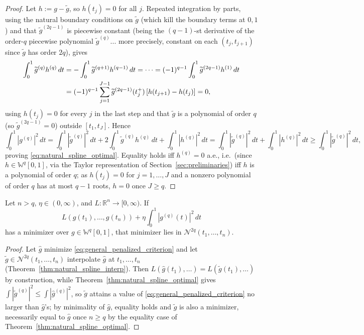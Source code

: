 \begin{proof}
Let $h:=g-\widetilde{g}$, so $h(t_j)=0$ for all $j$. Repeated integration
by parts, using the natural boundary conditions on $\widetilde{g}$ (which
kill the boundary terms at $0,1$) and that $\widetilde{g}^{(2q-1)}$ is
piecewise constant (being the $(q-1)$-st derivative of the order-$q$
piecewise polynomial $\widetilde{g}^{(q)}$... more precisely, constant on
each $(t_j,t_{j+1})$ since $\widetilde{g}$ has order $2q$), gives
\begin{align}
\int_0^1\widetilde{g}^{(q)}h^{(q)}\,dt &= -\int_0^1\widetilde{g}^{(q+1)}
h^{(q-1)}\,dt = \cdots = (-1)^{q-1}\int_0^1\widetilde{g}^{(2q-1)}h^{(1)}\,dt
\notag \\
&= (-1)^{q-1}\sum_{j=1}^{J-1}\widetilde{g}^{(2q-1)}(t_j^+)\,[h(t_{j+1})-
h(t_j)] = 0,
\label{eq:integration_by_parts}
\end{align}
using $h(t_j)=0$ for every $j$ in the last step and that $\widetilde{g}$
is a polynomial of order $q$ (so $\widetilde{g}^{(2q-1)}=0$) outside
$[t_1,t_J]$. Hence
\[
\int_0^1|g^{(q)}|^2\,dt = \int_0^1|\widetilde{g}^{(q)}|^2\,dt + 2\int_0^1
\widetilde{g}^{(q)}h^{(q)}\,dt + \int_0^1|h^{(q)}|^2\,dt =
\int_0^1|\widetilde{g}^{(q)}|^2\,dt + \int_0^1|h^{(q)}|^2\,dt \geq
\int_0^1|\widetilde{g}^{(q)}|^2\,dt,
\]
proving \eqref{eq:natural_spline_optimal}. Equality holds iff
$h^{(q)}=0$ a.e., i.e.\ (since $h\in\mathbb{W}^q[0,1]$, via the Taylor
representation of Section~\ref{sec:preliminaries}) iff $h$ is a
polynomial of order $q$; as $h(t_j)=0$ for $j=1,\dots,J$ and a nonzero
polynomial of order $q$ has at most $q-1$ roots, $h=0$ once $J\geq q$.
\end{proof}

\begin{theorem}
\label{thm:natural_spline_finite_dim}
Let $n>q$, $\eta\in(0,\infty)$, and $L:\mathbb{R}^n\to[0,\infty)$. If
\begin{equation}
L(g(t_1),\dots,g(t_n)) + \eta\int_0^1|g^{(q)}(t)|^2\,dt
\label{eq:general_penalized_criterion}
\end{equation}
has a minimizer over $g\in\mathbb{W}^q[0,1]$, that minimizer lies in
$\mathcal{N}^{2q}(t_1,\dots,t_n)$.
\end{theorem}

\begin{proof}
Let $\widehat{g}$ minimize \eqref{eq:general_penalized_criterion} and let
$\widetilde{g}\in\mathcal{N}^{2q}(t_1,\dots,t_n)$ interpolate $\widehat{g}$
at $t_1,\dots,t_n$ (Theorem~\ref{thm:natural_spline_interp}). Then
$L(\widehat{g}(t_1),\dots)=L(\widetilde{g}(t_1),\dots)$ by construction,
while Theorem~\ref{thm:natural_spline_optimal} gives $\int|\widetilde{g}
^{(q)}|^2\leq\int|\widehat{g}^{(q)}|^2$, so $\widetilde{g}$ attains a value
of \eqref{eq:general_penalized_criterion} no larger than $\widehat{g}$'s;
by minimality of $\widehat{g}$, equality holds and $\widetilde{g}$ is also
a minimizer, necessarily equal to $\widehat{g}$ once $n\geq q$ by the
equality case of Theorem~\ref{thm:natural_spline_optimal}.
\end{proof}

